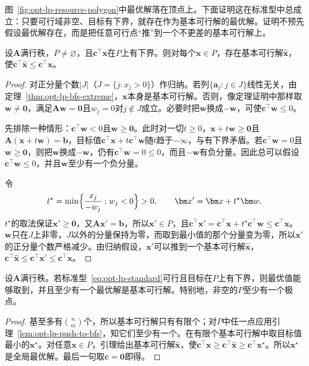图~\ref{fig:opt-lp-resource-polygon}中最优解落在顶点上。下面证明这在标准型中总成立：只要可行域非空、目标有下界，就存在作为基本可行解的最优解。证明不预先假设最优解存在，而是把任意可行点“推”到一个不更差的基本可行解上。

\begin{lemma}[推向基本可行解]
\label{lem:opt-lp-push-to-bfs}
设$\bm A$满行秩，$P\ne\varnothing$，且$\bm c^\top\bm x$在$P$上有下界。则对每个$\bm x\in P$，存在基本可行解$\widehat{\bm x}$，使$\bm c^\top\widehat{\bm x}\le\bm c^\top\bm x$。
\end{lemma}

\begin{proof}
对正分量个数$|J|$（$J=\{j:x_j>0\}$）作归纳。若列$\{\bm a_j:j\in J\}$线性无关，由定理~\ref{thm:opt-lp-bfs-extreme}，$\bm x$本身是基本可行解。否则，像定理证明中那样取$\bm w\ne\bm 0$，满足$\bm A\bm w=\bm 0$且$w_j=0$对$j\notin J$成立。必要时把$\bm w$换成$-\bm w$，可使$\bm c^\top\bm w\le0$。

先排除一种情形：$\bm c^\top\bm w<0$且$\bm w\ge\bm 0$。此时对一切$t\ge0$，$\bm x+t\bm w\ge\bm 0$且$\bm A(\bm x+t\bm w)=\bm b$，目标值$\bm c^\top\bm x+t\bm c^\top\bm w$随$t$趋于$-\infty$，与有下界矛盾。若$\bm c^\top\bm w=0$且$\bm w\ge\bm 0$，则把$\bm w$换成$-\bm w$，仍有$\bm c^\top\bm w=0\le0$，而且$-\bm w$有负分量。因此总可以假设$\bm c^\top\bm w\le0$，并且$\bm w$至少有一个负分量。

令
\[
  t^\star=\min\Bigl\{\frac{x_j}{-w_j}:w_j<0\Bigr\}>0,\qquad
  \bm x'=\bm x+t^\star\bm w.
\]
$t^\star$的取法保证$\bm x'\ge\bm 0$，又$\bm A\bm x'=\bm b$，所以$\bm x'\in P$，且$\bm c^\top\bm x'=\bm c^\top\bm x+t^\star\bm c^\top\bm w\le\bm c^\top\bm x$。$\bm w$只在$J$上非零，$J$以外的分量保持为零，而取到最小值的那个分量变为零，所以$\bm x'$的正分量个数严格减少。由归纳假设，$\bm x'$可以推到一个基本可行解$\widehat{\bm x}$，$\bm c^\top\widehat{\bm x}\le\bm c^\top\bm x'\le\bm c^\top\bm x$。
\end{proof}

\begin{theorem}[最优基本可行解的存在性]
\label{thm:opt-lp-optimal-bfs}
设$\bm A$满行秩。若标准型~\eqref{eq:opt-lp-standard}可行且目标在$P$上有下界，则最优值能够取到，并且至少有一个最优解是基本可行解。特别地，非空的$P$至少有一个极点。
\end{theorem}

\begin{proof}
基至多有$\binom nm$个，所以基本可行解只有有限个；对$P$中任一点应用引理~\ref{lem:opt-lp-push-to-bfs}，知它们至少有一个。在有限个基本可行解中取目标值最小的$\bm x^\star$。对任意$\bm x\in P$，引理给出基本可行解$\widehat{\bm x}$，使$\bm c^\top\bm x\ge\bm c^\top\widehat{\bm x}\ge\bm c^\top\bm x^\star$。所以$\bm x^\star$是全局最优解。最后一句取$\bm c=\bm 0$即得。
\end{proof}

